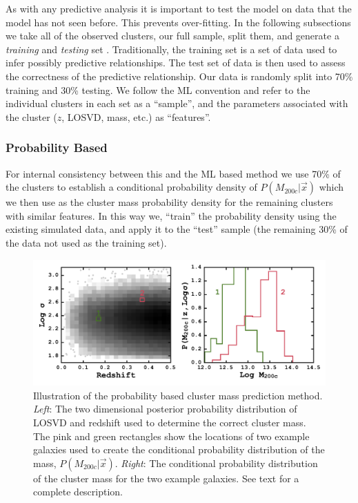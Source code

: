 As with any predictive analysis it is important to test the model on data that the model has not seen before. This prevents over-fitting. In the following subsections we take all of the observed clusters, our full sample, split them, and generate a \emph{training} and \emph{testing} set . Traditionally, the training set is a set of data used to infer possibly predictive relationships. The test set of data is then used to assess the correctness of the predictive relationship. Our data is randomly split into 70\% training and 30\% testing. We follow the ML convention and refer to the individual clusters in each set as a ``sample'', and the parameters associated with the cluster ($z$, LOSVD, mass, etc.) as ``features''.

\subsubsection{Probability Based}\label{sec:probability method}
For internal consistency between this and the ML based method we use 70\% of the clusters to establish a conditional probability density of $P(M_{200c} | \vec{x})$ which we then use as the cluster mass probability density for the remaining clusters with similar features. In this way we, ``train'' the probability density using the existing simulated data, and apply it to the ``test'' sample (the remaining 30\% of the data not used as the training set).

\begin{figure}
	\begin{centering}
		\includegraphics[width=\textwidth]{figures1/prob_example.pdf} 
	\end{centering}
	\caption[Illustration of the probability based cluster mass prediction method.]{Illustration of the probability based cluster mass prediction method. \emph{Left}: The two dimensional posterior probability distribution of LOSVD and redshift used to determine the correct cluster mass. The pink and green rectangles show the locations of two example galaxies used to create the conditional probability distribution of the mass, $P(M_{200c}|\vec{x})$. \emph{Right}: The conditional probability distribution of the cluster mass for the two example galaxies. See text for a complete description.}
	\label{fig: probability corner} 
\end{figure}

